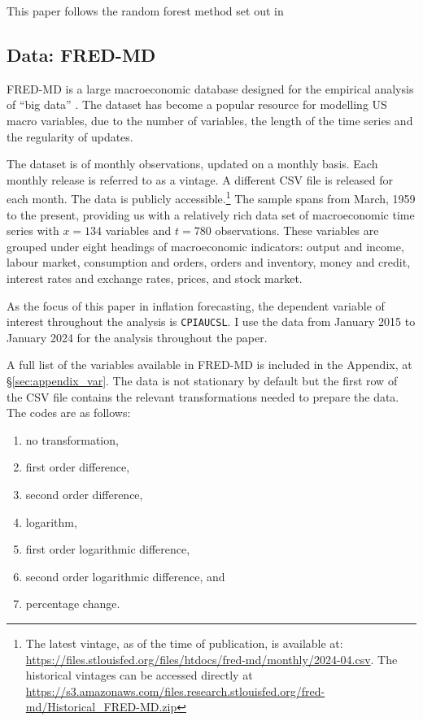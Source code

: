 This paper follows the random forest method set out in \textcite{Medeiros2021ForecastingMethods}



\subsection{Data: FRED-MD}

FRED-MD is a large macroeconomic database designed for the empirical analysis of “big data” \autocite{McCracken2016FRED-MD:Research}. The dataset has become a popular resource for modelling US macro variables, due to the number of variables, the length of the time series and the regularity of updates.

The dataset is of monthly observations, updated on a monthly basis. Each monthly release is referred to as a vintage. A different CSV file is released for each month. The data is publicly accessible.\footnote{The latest vintage, as of the time of publication, is available at: \url{https://files.stlouisfed.org/files/htdocs/fred-md/monthly/2024-04.csv}. The historical vintages can be accessed directly at \url{https://s3.amazonaws.com/files.research.stlouisfed.org/fred-md/Historical_FRED-MD.zip}
} The sample spans from March, 1959 to the present, providing us with a relatively rich data set of macroeconomic time series with $x = 134$ variables and $t = 780$ observations. These variables are grouped under eight headings of macroeconomic indicators: output and income, labour market, consumption and orders, orders and inventory, money and credit, interest rates and exchange rates, prices, and stock market.

As the focus of this paper in inflation forecasting, the dependent variable of interest throughout the analysis is \texttt{CPIAUCSL}. I use the data from January 2015 to January 2024 for the analysis throughout the paper.

A full list of the variables available in FRED-MD is included in the Appendix, at \S \ref{sec:appendix_var}. The data is not stationary by default but the first row of the CSV file contains the relevant transformations needed to prepare the data. The codes are as follows:

\begin{enumerate}
    \item no transformation,
    \item first order difference,
    \item second order difference,
    \item logarithm,
    \item first order logarithmic difference,
    \item second order logarithmic difference, and
    \item percentage change.
\end{enumerate}

